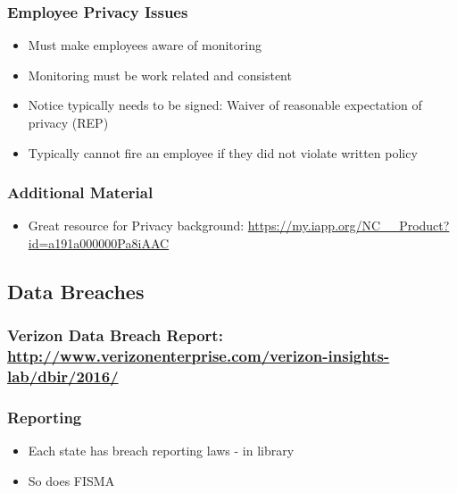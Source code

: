 \documentclass[11pt]{article}
\begin{document}
\subsubsection{Employee Privacy Issues}
\label{sec:org4f9258f}
\begin{itemize}
\item Must make employees aware of monitoring
\item Monitoring must be work related and consistent
\item Notice typically needs to be signed: Waiver of reasonable expectation of privacy (REP)
\item Typically cannot fire an employee if they did not violate written policy
\end{itemize}
\subsubsection{Additional Material}
\label{sec:org9a9b55c}
\begin{itemize}
\item Great resource for Privacy background: \url{https://my.iapp.org/NC\_\_Product?id=a191a000000Pa8iAAC}
\end{itemize}
\subsection{Data Breaches}
\label{sec:org2c0ba31}
\subsubsection{Verizon Data Breach Report: \url{http://www.verizonenterprise.com/verizon-insights-lab/dbir/2016/}}
\label{sec:org08471ab}
\subsubsection{Reporting}
\label{sec:org28d7339}
\begin{itemize}
\item Each state has breach reporting laws - in library
\item So does FISMA
\end{itemize}
\end{document}
